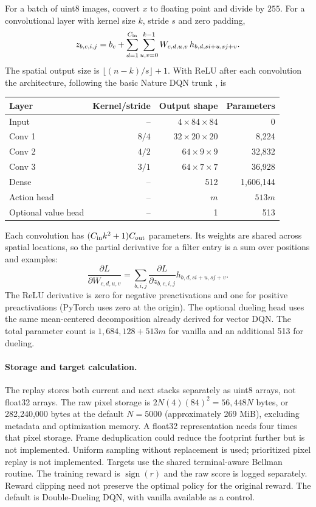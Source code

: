 \documentclass[11pt,a4paper]{article}
\begin{document}
For a batch of uint8 images, convert $x$ to floating point and divide by $255$.
For a convolutional layer with kernel size $k$, stride $s$ and zero padding,
\[
z_{b,c,i,j}=b_c+\sum_{d=1}^{C_{\rm in}}\sum_{u,v=0}^{k-1}
 W_{c,d,u,v}\,h_{b,d,si+u,sj+v}.
\]
The spatial output size is $\lfloor(n-k)/s\rfloor+1$. With ReLU after each
convolution the architecture, following the basic Nature DQN trunk \cite{mnih}, is
\begin{center}
\begin{tabular}{lrrr}
\toprule Layer & Kernel/stride & Output shape & Parameters\\
\midrule
Input & -- & $4\times84\times84$ & 0\\
Conv 1 & $8/4$ & $32\times20\times20$ & 8,224\\
Conv 2 & $4/2$ & $64\times9\times9$ & 32,832\\
Conv 3 & $3/1$ & $64\times7\times7$ & 36,928\\
Dense & -- & 512 & 1,606,144\\
Action head & -- & $m$ & $513m$\\
Optional value head & -- & 1 & 513\\
\bottomrule
\end{tabular}
\end{center}
Each convolution has $(C_{\rm in}k^2+1)C_{\rm out}$ parameters. Its weights
are shared across spatial locations, so the partial derivative for a filter entry
is a sum over positions and examples:
\[
\frac{\partial L}{\partial W_{c,d,u,v}}=
 \sum_{b,i,j}\frac{\partial L}{\partial z_{b,c,i,j}}
 h_{b,d,si+u,sj+v}.
\]
The ReLU derivative is zero for negative preactivations and one for positive
preactivations (PyTorch uses zero at the origin). The optional dueling head uses
the same mean-centered decomposition already derived for vector DQN. The total
parameter count is $1,684,128+513m$ for vanilla and an additional 513 for dueling.

\paragraph{Storage and target calculation.}
The replay stores both current and next stacks separately as uint8 arrays, not
float32 arrays. The raw pixel storage is $2N(4)(84)^2=56,448N$ bytes, or
282,240,000 bytes at the default $N=5000$ (approximately 269 MiB), excluding
metadata and optimization memory. A float32 representation needs four times that
pixel storage. Frame deduplication could reduce the footprint further but is not
implemented. Uniform sampling without replacement is used; prioritized pixel
replay is not implemented. Targets use the shared terminal-aware Bellman routine.
The training reward is $\operatorname{sign}(r)$ and the raw score is logged separately.
Reward clipping need not preserve the optimal policy for the original reward.
The default is Double-Dueling DQN, with vanilla available as a control.
\end{document}
